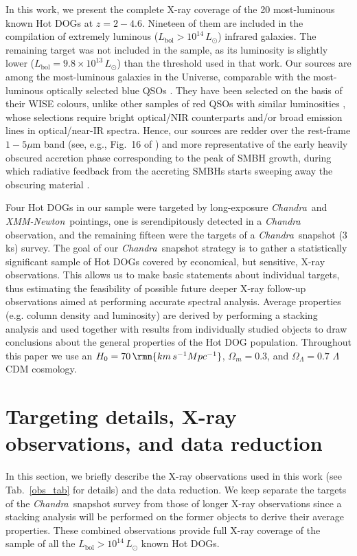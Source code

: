\documentclass[useAMS,usenatbib]{mnras}
\newcommand*{\xmm}{\textit{\mbox{XMM-Newton}}}
\newcommand*{\chandra}{\textit{Chandra}}
\begin{document}
In this work, we present the complete X-ray coverage of the 20 most-luminous known Hot DOGs at $z=2-4.6$. Nineteen of them are included in the \cite{Tsai15} compilation of extremely luminous ($L_{\mathrm{bol}}>10^{14}\, L_\odot$) infrared galaxies. The remaining target was not included in the \cite{Tsai15} sample, as its luminosity is slightly lower ($L_{\mathrm{bol}}=9.8\times10^{13}\, L_\odot$) than the threshold used in that work.
Our sources are among the most-luminous galaxies in the Universe, comparable with the most-luminous optically selected blue QSOs \citep[e.g.,][]{Just07}. They have been selected on the basis of their WISE colours, unlike other samples of red QSOs  with similar luminosities \citep[e.g.,][]{Urrutia05, Glikman07, Banerji15,Hamann17}, whose selections require bright optical/NIR counterparts and/or broad emission lines in optical/near-IR spectra. Hence, our sources are redder over the rest-frame $1-5 \mu\mathrm{m}$ band (see, e.g., Fig.~16 of \citealt{Hamann17}) and more representative of the early heavily obscured accretion phase corresponding to the peak of SMBH growth, during which radiative feedback from the accreting SMBHs starts sweeping away the obscuring material \citep[e.g.][]{Blecha17}. 

Four Hot DOGs in our sample were targeted by long-exposure \chandra\, and \xmm\, pointings, one is serendipitously detected in a \chandra\, observation, and the remaining fifteen were the targets of a \chandra\, snapshot (3 ks) survey.
The goal of our \chandra\, snapshot strategy is to gather a statistically significant sample of Hot DOGs covered by economical, but sensitive, X-ray observations. This allows us to make basic statements about individual targets, thus estimating the feasibility of possible future deeper \mbox{X-ray} follow-up observations aimed at performing accurate spectral analysis. Average properties (e.g. column density and luminosity) are derived by performing a stacking analysis and used together with results from individually studied objects to draw conclusions about the general properties of the Hot DOG population. Throughout this paper we use an $H_0=70\,\rmn{km\,s^{-1}Mpc^{-1}}$, $\Omega_m=0.3$, and $\Omega_\Lambda=0.7$ $\Lambda$CDM cosmology.



\section{Targeting details, X-ray observations, and data reduction}\label{obs}
In this section, we briefly describe the X-ray observations used in this work  (see Tab.~\ref{obs_tab} for details) and the data reduction. We keep separate the targets of the \chandra\, snapshot survey from those of longer X-ray observations since a stacking analysis will be performed on the former objects to derive their average properties. These combined observations provide full X-ray coverage of the \cite{Tsai15} sample of all the $L_{\mathrm{bol}}>10^{14}\, L_\odot$ known Hot DOGs.
\end{document}
